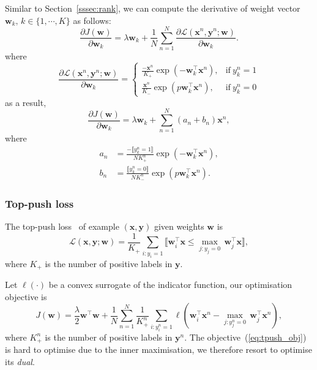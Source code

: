 \documentclass[9pt]{extarticle}
\newcommand{\llb}{\llbracket}
\newcommand{\rrb}{\rrbracket}
\newcommand{\x}{\mathbf{x}}
\newcommand{\y}{\mathbf{y}}
\newcommand{\1}{\mathbf{1}}
\newcommand{\w}{\mathbf{w}}
\newcommand{\LCal}{\mathcal{L}}
\begin{document}
Similar to Section~\ref{sssec:rank}, we can compute the derivative of weight vector $\w_k, \, k \in \{1,\cdots,K\}$ as follows:
$$
\frac{\partial J(\w)} {\partial \w_k} = \lambda \w_k + \frac{1}{N} \sum_{n=1}^N \frac{\partial \LCal(\x^n, \y^n; \w)} {\partial \w_k}.
$$
where
\begin{equation}
\frac{\partial \LCal(\x^n, \y^n; \w)} {\partial \w_k} =
\begin{cases}
\frac{-\x^n}{K_+} \exp(-\w_k^\top \x^n),  & \text{if} \ y_k^n=1 \\
\frac{ \x^n}{K_-} \exp(p\w_k^\top \x^n),  & \text{if} \ y_k^n=0
\end{cases}
\end{equation}
as a result,
\begin{equation}
\label{eq:grad_pclass}
\frac{\partial J(\w)} {\partial \w_k} = \lambda \w_k + \sum_{n=1}^N (a_n + b_n) \x^n,
\end{equation}
where
\begin{align*}
a_n &= \frac{-\llb y_k^n=1 \rrb} {N K_+^n} \exp( -\w_k^\top \x^n), \\
b_n &= \frac{ \llb y_k^n=0 \rrb} {N K_-^n} \exp(p \w_k^\top \x^n).
\end{align*}



\subsubsection{Top-push loss}
\label{sssec:tpush}

The top-push loss~\cite{li2014top} of example $(\x, \y)$ given weights $\w$ is
\begin{equation}
\label{eq:tpush_loss}
\LCal(\x, \y; \w) = \frac{1}{K_+} \sum_{i:y_i=1} \llb \w_i^\top \x \le \underset{j:y_j=0}{\max} \, \w_j^\top \x \rrb,
\end{equation}
where $K_+$ is the number of positive labels in $\y$.

Let $\ell(\cdot)$ be a convex surrogate of the indicator function, our optimisation objective is
\begin{equation}
\label{eq:tpush_obj}
J(\w) = \frac{\lambda}{2} \w^\top \w + \frac{1}{N} \sum_{n=1}^N 
        \frac{1}{K_+^n} \sum_{i:y_i^n=1} \ell \left( \w_i^\top \x^n - \underset{j:y_j^n=0}{\max} \, \w_j^\top \x^n \right),
\end{equation}
where $K_+^n$ is the number of positive labels in $\y^n$.
The objective~(\ref{eq:tpush_obj}) is hard to optimise due to the inner maximisation,
we therefore resort to optimise its \emph{dual}.
\end{document}
